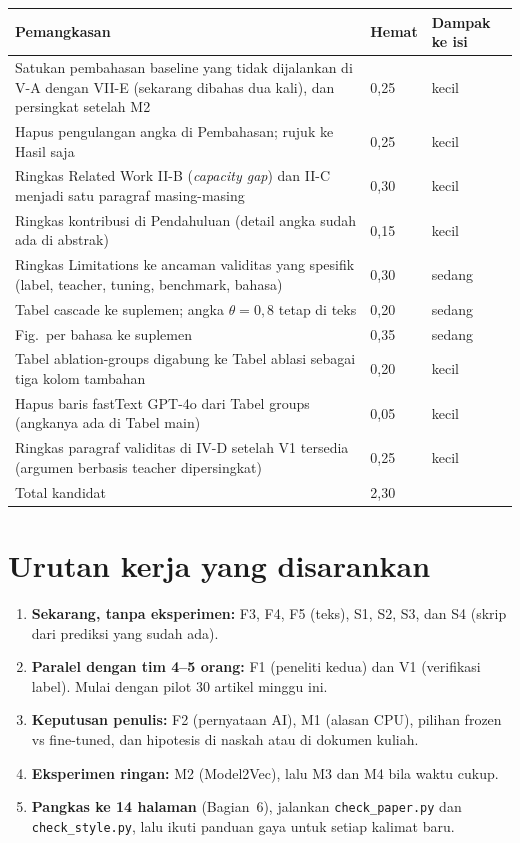 \documentclass[10pt,a4paper]{article}
\begin{document}
\begin{longtable}{@{}p{}p{}p{}@{}}
\toprule
Pemangkasan & Hemat & Dampak ke isi\\
\midrule
\endhead
Satukan pembahasan baseline yang tidak dijalankan di V-A dengan VII-E (sekarang dibahas dua kali), dan persingkat setelah M2 & 0,25 & kecil\\
Hapus pengulangan angka di Pembahasan; rujuk ke Hasil saja & 0,25 & kecil\\
Ringkas Related Work II-B (\emph{capacity gap}) dan II-C menjadi satu paragraf masing-masing & 0,30 & kecil\\
Ringkas kontribusi di Pendahuluan (detail angka sudah ada di abstrak) & 0,15 & kecil\\
Ringkas Limitations ke ancaman validitas yang spesifik (label, teacher, tuning, benchmark, bahasa) & 0,30 & sedang\\
Tabel cascade ke suplemen; angka $\theta=0{,}8$ tetap di teks & 0,20 & sedang\\
Fig.~per bahasa ke suplemen & 0,35 & sedang\\
Tabel ablation-groups digabung ke Tabel ablasi sebagai tiga kolom tambahan & 0,20 & kecil\\
Hapus baris fastText GPT-4o dari Tabel groups (angkanya ada di Tabel main) & 0,05 & kecil\\
Ringkas paragraf validitas di IV-D setelah V1 tersedia (argumen berbasis teacher dipersingkat) & 0,25 & kecil\\
\midrule
Total kandidat & 2,30 &\\
\bottomrule
\end{longtable}

\section{Urutan kerja yang disarankan}
\begin{enumerate}
  \item \textbf{Sekarang, tanpa eksperimen:} F3, F4, F5 (teks), S1, S2, S3, dan S4 (skrip dari prediksi yang sudah ada).
  \item \textbf{Paralel dengan tim 4--5 orang:} F1 (peneliti kedua) dan V1 (verifikasi label). Mulai dengan pilot 30 artikel minggu ini.
  \item \textbf{Keputusan penulis:} F2 (pernyataan AI), M1 (alasan CPU), pilihan frozen vs fine-tuned, dan hipotesis di naskah atau di dokumen kuliah.
  \item \textbf{Eksperimen ringan:} M2 (Model2Vec), lalu M3 dan M4 bila waktu cukup.
  \item \textbf{Pangkas ke 14 halaman} (Bagian~6), jalankan \texttt{check\_paper.py} dan \texttt{check\_style.py}, lalu ikuti panduan gaya untuk setiap kalimat baru.
\end{enumerate}
\end{document}
